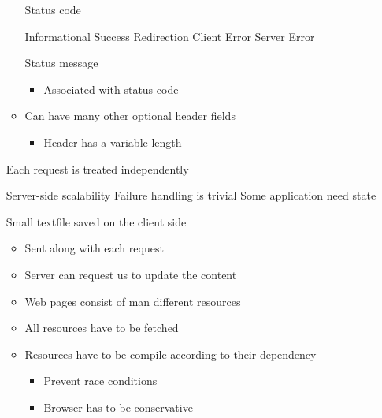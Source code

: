 \begin{itemize}
\begin{itemize}
             Status code
                \begin{itemize}
                     Informational
                     Success
                     Redirection
                     Client Error
                     Server Error
                \end{itemize}
             Status message
                \begin{itemize}
                    \item Associated with status code
                \end{itemize}
            \item Can have many other optional header fields
                \begin{itemize}
                    \item Header has a variable length
                \end{itemize}
        \end{itemize}
        \begin{itemize}
             Each request is treated independently
                \begin{itemize}
                    \ipro Server-side scalability
                    \ipro Failure handling is trivial
                    \icon Some application need state
                \end{itemize}
             Small textfile saved on the client side
                \begin{itemize}
                    \item Sent along with each request
                    \item Server can request us to update the content
                \end{itemize}
        \end{itemize}
        \begin{itemize}
            \item Web pages consist of man different resources
            \item All resources have to be fetched
            \item Resources have to be compile according to their dependency
                \begin{itemize}
                    \item Prevent race conditions
                    \item Browser has to be conservative

\end{itemize}
\end{itemize}
\end{itemize}

